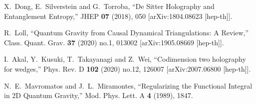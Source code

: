 \documentclass[a4paper,12pt]{article}
\begin{document}
\begin{thebibliography}{}
X.~Dong, E.~Silverstein and G.~Torroba,
``De Sitter Holography and Entanglement Entropy,''
JHEP \textbf{07} (2018), 050
[arXiv:1804.08623 [hep-th]].

R.~Loll,
``Quantum Gravity from Causal Dynamical Triangulations: A Review,''
Class. Quant. Grav. \textbf{37} (2020) no.1, 013002
[arXiv:1905.08669 [hep-th]].
  
I.~Akal, Y.~Kusuki, T.~Takayanagi and Z.~Wei,
``Codimension two holography for wedges,''
Phys. Rev. D \textbf{102} (2020) no.12, 126007
[arXiv:2007.06800 [hep-th]].
  
N.~E.~Mavromatos and J.~L.~Miramontes,
``Regularizing the Functional Integral in 2D Quantum Gravity,''
Mod. Phys. Lett. A \textbf{4} (1989), 1847.


\end{thebibliography}
\end{document}
